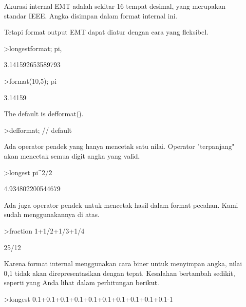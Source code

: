 \documentclass[a4paper,10pt]{article}
\begin{document}
\begin{eulernotebook}
\begin{eulercomment}
\begin{eulercomment}
\begin{eulercomment}
Akurasi internal EMT adalah sekitar 16 tempat desimal, yang merupakan
standar IEEE. Angka disimpan dalam format internal ini.

Tetapi format output EMT dapat diatur dengan cara yang fleksibel.
\end{eulercomment}
\begin{eulerprompt}
>longestformat; pi,
\end{eulerprompt}
\begin{euleroutput}
  3.141592653589793
\end{euleroutput}
\begin{eulerprompt}
>format(10,5); pi
\end{eulerprompt}
\begin{euleroutput}
    3.14159 
\end{euleroutput}
\begin{eulercomment}
The default is defformat().
\end{eulercomment}
\begin{eulerprompt}
>defformat; // default
\end{eulerprompt}
\begin{eulercomment}
Ada operator pendek yang hanya mencetak satu nilai. Operator
"terpanjang" akan mencetak semua digit angka yang valid.
\end{eulercomment}
\begin{eulerprompt}
>longest pi^2/2
\end{eulerprompt}
\begin{euleroutput}
        4.934802200544679 
\end{euleroutput}
\begin{eulercomment}
Ada juga operator pendek untuk mencetak hasil dalam format pecahan.
Kami sudah menggunakannya di atas.
\end{eulercomment}
\begin{eulerprompt}
>fraction 1+1/2+1/3+1/4
\end{eulerprompt}
\begin{euleroutput}
  25/12
\end{euleroutput}
\begin{eulercomment}
Karena format internal menggunakan cara biner untuk menyimpan angka,
nilai 0,1 tidak akan direpresentasikan dengan tepat. Kesalahan
bertambah sedikit, seperti yang Anda lihat dalam perhitungan berikut.
\end{eulercomment}
\begin{eulerprompt}
>longest 0.1+0.1+0.1+0.1+0.1+0.1+0.1+0.1+0.1+0.1-1
\end{eulerprompt}

\end{eulercomment}
\end{eulercomment}
\end{eulernotebook}
\end{document}
